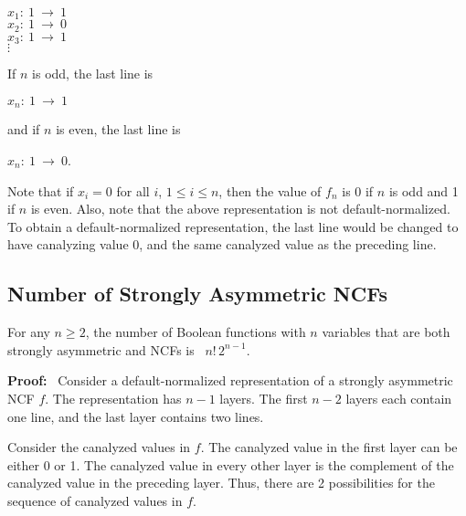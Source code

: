 \medskip

\noindent
\hspace*{0.25in}
$x_1:~ 1 ~\longrightarrow~ 1$ \\
\hspace*{0.25in}
$x_2:~ 1 ~\longrightarrow~ 0$ \\
\hspace*{0.25in}
$x_3:~ 1 ~\longrightarrow~ 1$ \\
\hspace*{0.75in}
$\vdots$ 

\smallskip

\noindent
If $n$ is odd, the last line is 

\smallskip

\noindent
\hspace*{0.25in}
$x_n:~ 1 ~\longrightarrow~ 1$ 

\smallskip

\noindent
and if $n$ is even, the last line is 

\smallskip

\noindent
\hspace*{0.25in}
$x_n:~ 1 ~\longrightarrow~ 0$. 

\smallskip

\noindent
Note that if $x_i = 0$ for all $i$, $1 \leq i \leq n$, then the
value of $f_n$ is 0 if $n$ is odd and 1 if $n$ is even.  Also, note
that the above representation is not default-normalized. 
To obtain a default-normalized 
representation, the last line would be changed to have canalyzing
value 0, and the same canalyzed value as the preceding line.

\subsection{Number of Strongly Asymmetric NCFs}
\label{sse:number_strongly_asymmetric}

\begin{theorem}\label{thm:count_strongly_asymmetric}
For any $n \geq 2$, the number of Boolean functions with $n$ variables 
that are both strongly asymmetric and NCFs is~ $n! \, 2^{n-1}$.
\end{theorem}

\noindent
\textbf{Proof:}~
Consider a default-normalized representation of a strongly asymmetric NCF $f$.
The representation has $n-1$ layers.
The first $n-2$ layers each contain one line, and the last layer contains two lines.

Consider the canalyzed values in $f$. The canalyzed value in the
first layer can be either 0 or 1.  The canalyzed value in every
other layer is the complement of the canalyzed value in the preceding
layer.  Thus, there are 2 possibilities for the sequence of canalyzed
values in $f$.

